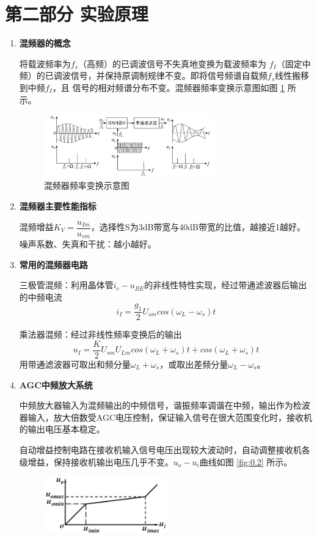 \documentclass[UTF8]{ctexart}
\begin{document}
\section{第二部分 \texorpdfstring{\quad}{} 实验原理}
\begin{enumerate}
    \item \textbf{混频器的概念}

    将载波频率为$f_s$（高频）的已调波信号不失真地变换为载波频率为 $f_I$（固定中频）的已调波信号，并保持原调制规律不变。即将信号频谱自载频$f_s$线性搬移到中频$f_I$，且
    信号的相对频谱分布不变。混频器频率变换示意图如图 \ref{fig:0.1} 所示。
    \begin{figure}[H]
        \centering
        \includegraphics[width=0.7\textwidth]{pics/0.1.png}

        \caption{混频器频率变换示意图}\label{fig:0.1}
    \end{figure}
    \vspace{-2em}
    \item \textbf{混频器主要性能指标}

    混频增益$K_V=\dfrac{u_{Im}}{u_{sm}}$，选择性S为3dB带宽与40dB带宽的比值，越接近1越好。噪声系数、失真和干扰：越小越好。

    \item \textbf{常用的混频器电路}

    三极管混频：利用晶体管$i_c-u_{BE}$的非线性特性实现，经过带通滤波器后输出的中频电流
    \[i_I=\dfrac{g_1}{2}U_{sm}cos(\omega_L-\omega_s)t\]

    乘法器混频：经过非线性频率变换后的输出
    \[u_I=\dfrac{K}{2}U_{sm}U_{Lm}cos(\omega_L+\omega_s)t+cos(\omega_L+\omega_s)t\]
    用带通滤波器可取出和频分量$\omega_L+\omega_s$，或取出差频分量$\omega_L-\omega_s$。

    \item \textbf{AGC中频放大系统}

    中频放大器输入为混频输出的中频信号，谐振频率调谐在中频，输出作为检波器输入，放大倍数受AGC电压控制，保证输入信号在很大范围变化时，接收机的输出电压基本稳定。

    自动增益控制电路在接收机输入信号电压出现较大波动时，自动调整接收机各级增益，保持接收机输出电压几乎不变。$u_o-u_i$曲线如图 \ref{fig:0.2} 所示。
    \begin{figure}[H]
        \centering
        \includegraphics[width=0.5\textwidth]{pics/0.2.png}


\end{figure}
\end{enumerate}
\end{document}
